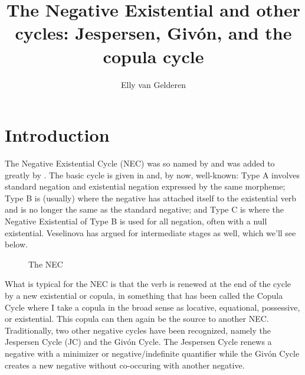 \documentclass[output=paper,draft,draftmode,colorlinks,citecolor=brown]{langscibook}
\author{Elly van Gelderen\affiliation{Arizona State University}}
\title{The Negative Existential and other cycles: Jespersen, Givón, and the copula cycle}
\begin{document}
\AffiliationsWithoutIndexing{}
\maketitle

\section{Introduction}

The Negative Existential Cycle (NEC) was so named by
\citet{Croft1991} and was added to greatly by
\textcites(e.g.)(){Veselinova2013}{Veselinova2016}. The basic cycle is
given in  and, by now, well-known: Type A involves
standard negation and existential negation expressed by the same morpheme;
Type B is (usually) where the negative has attached itself to the
existential verb and is no longer the same as the standard negative; and
Type C is where the Negative Existential of Type B is used for all
negation, often with a null existential. Veselinova has argued for
intermediate stages as well, which we'll see below.
%
\begin{figure}
\caption{The NEC \citep{Croft1991}}
\label{fig:other-Croft}
\end{figure}
%
What is typical for the NEC is that the verb is renewed at the end of the
cycle by a new existential or copula, in something that has been called the
Copula Cycle \citep{Katz1996} where I take a copula in the broad sense as
locative, equational, possessive, or existential. This copula can then
again be the source to another NEC. Traditionally, two other negative
cycles have been recognized, namely the Jespersen Cycle (JC) and the Givón
Cycle. The Jespersen Cycle renews a negative with a minimizer or
negative\slash indefinite quantifier while the Givón Cycle creates a new negative without
co-occuring with another negative.
\end{document}
